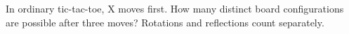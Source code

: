 In ordinary tic-tac-toe, X moves first. How many distinct board configurations are possible after three moves? Rotations and reflections count separately.
